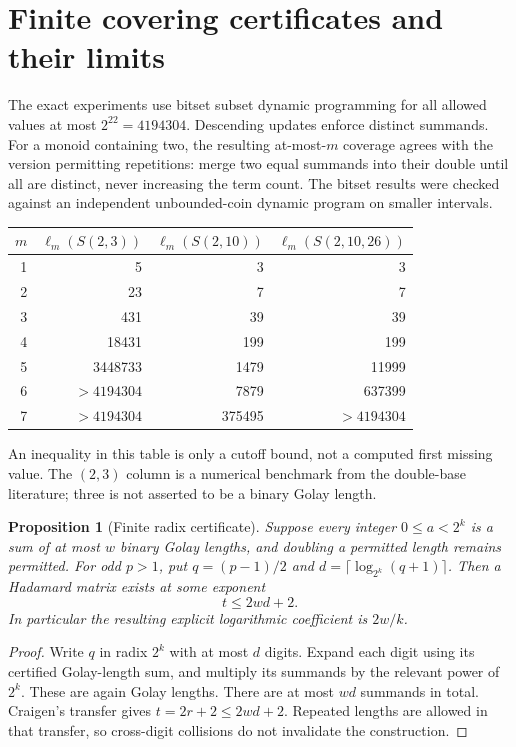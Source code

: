 \documentclass[11pt]{article}
\newtheorem{proposition}[theorem]{Proposition}
\begin{document}
\section{Finite covering certificates and their limits}
The exact experiments use bitset subset dynamic programming for all
allowed values at most $2^{22}=4194304$. Descending updates enforce
distinct summands. For a monoid containing two, the resulting at-most-$m$
coverage agrees with the version permitting repetitions: merge two equal
summands into their double until all are distinct, never increasing
the term count. The bitset results were checked against an independent
unbounded-coin dynamic program on smaller intervals.

\begin{center}
\begin{tabular}{r r r r}
\toprule
$m$ & $\ell_m(S(2,3))$ & $\ell_m(S(2,10))$ & $\ell_m(S(2,10,26))$\\
\midrule
1 & 5 & 3 & 3\\
2 & 23 & 7 & 7\\
3 & 431 & 39 & 39\\
4 & 18431 & 199 & 199\\
5 & 3448733 & 1479 & 11999\\
6 & $>4194304$ & 7879 & 637399\\
7 & $>4194304$ & 375495 & $>4194304$\\
\bottomrule
\end{tabular}
\end{center}
An inequality in this table is only a cutoff bound, not a computed first
missing value. The $(2,3)$ column is a numerical benchmark from the
double-base literature; three is not asserted to be a binary Golay length.

\begin{proposition}[Finite radix certificate]\label{prop:radix}
Suppose every integer $0\le a<2^k$ is a sum of at most $w$ binary Golay
lengths, and doubling a permitted length remains permitted. For odd
$p>1$, put $q=(p-1)/2$ and
$d=\lceil\log_{2^k}(q+1)\rceil$. Then a Hadamard matrix exists at some
exponent
\[
t\le2wd+2.
\]
In particular the resulting explicit logarithmic coefficient is $2w/k$.
\end{proposition}
\begin{proof}
Write $q$ in radix $2^k$ with at most $d$ digits. Expand each digit using
its certified Golay-length sum, and multiply its summands by the relevant
power of $2^k$. These are again Golay lengths. There are at most $wd$
summands in total. Craigen's transfer gives $t=2r+2\le2wd+2$.
Repeated lengths are allowed in that transfer, so cross-digit collisions
do not invalidate the construction.
\end{proof}
\end{document}
